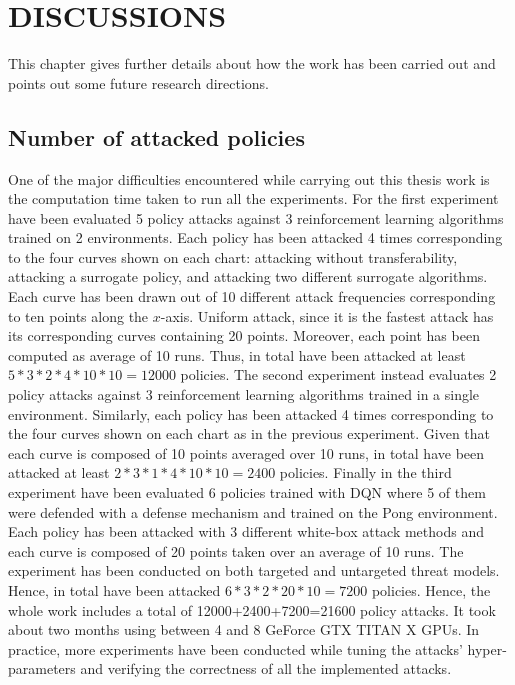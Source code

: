 \chapter{DISCUSSIONS}
\label{sec:discussions}

This chapter gives further details about how the work has been carried out and points out some future research directions.

\section{Number of attacked policies}
One of the major difficulties encountered while carrying out this thesis work is the computation time taken to run all the experiments. For the first experiment have been evaluated 5 policy attacks against 3 reinforcement learning algorithms trained on 2 environments. Each policy has been attacked 4 times corresponding to the four curves shown on each chart: attacking without transferability, attacking a surrogate policy, and attacking two different surrogate algorithms. Each curve has been drawn out of 10 different attack frequencies corresponding to ten points along the \(x\)-axis. Uniform attack, since it is the fastest attack has its corresponding curves containing 20 points. Moreover, each point has been computed as average of 10 runs. Thus, in total have been attacked at least \(5*3*2*4*10*10=12000\) policies. The second experiment instead evaluates 2 policy attacks against 3 reinforcement learning algorithms trained in a single environment. Similarly, each policy has been attacked 4 times corresponding to the four curves shown on each chart as in the previous experiment. Given that each curve is composed of 10 points averaged over 10 runs, in total have been attacked at least \( 2*3*1*4*10*10=2400\) policies. Finally in the third experiment have been evaluated 6 policies trained with DQN where 5 of them were defended with a defense mechanism and trained on the Pong environment. Each policy has been attacked with 3 different white-box attack methods and each curve is composed of 20 points taken over an average of 10 runs. The experiment has been conducted on both targeted and untargeted threat models. Hence, in total have been attacked \(6*3*2*20*10=7200\) policies. Hence, the whole work includes a total of 12000+2400+7200=21600 policy attacks. It took about two months using between 4 and 8 GeForce GTX TITAN X GPUs. In practice, more experiments have been conducted while tuning the attacks' hyper-parameters and verifying the correctness of all the implemented attacks.

